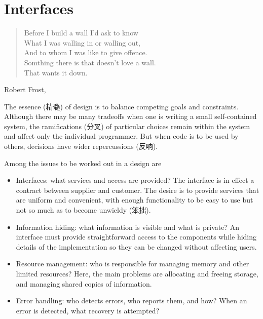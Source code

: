 \chapter{Interfaces}
\label{chap:interface}
\begin{quote}
    Before I build a wall I'd ask to know \\
    What I was walling in or walling out, \\
    And to whom I was like to give offence. \\
    Somthing there is that doesn't love a wall. \\
    That wants it down.
\end{quote}
\begin{quotesrc}
    Robert Frost, 
\end{quotesrc}

The essence (精髓) of design is to balance competing goals and constraints.
Although there may be many tradeoffs when one is writing a small
self-contained system, the ramifications (分叉) of particular choices
remain within the system and affect only the individual programmer. But
when code is to be used by others, decisions have wider repercussions
(反响).

Among the issues to be worked out in a design are
\begin{itemize}
    \item Interfaces: what services and access are provided? The interface
        is in effect a contract between supplier and customer. The desire
        is to provide services that are uniform and convenient, with enough
        functionality to be easy to use but not so much as to become
        unwieldy (笨拙).
    \item Information hiding: what information is visible and what is
        private? An interface must provide straightforward access to the
        components while hiding details of the implementation so they can
        be changed without affecting users.
    \item Resource management: who is responsible for managing memory and
        other limited resources? Here, the main problems are allocating and
        freeing storage, and managing shared copies of information.
    \item Error handling: who detects errors, who reports them, and how?
        When an error is detected, what recovery is attempted?
\end{itemize}

